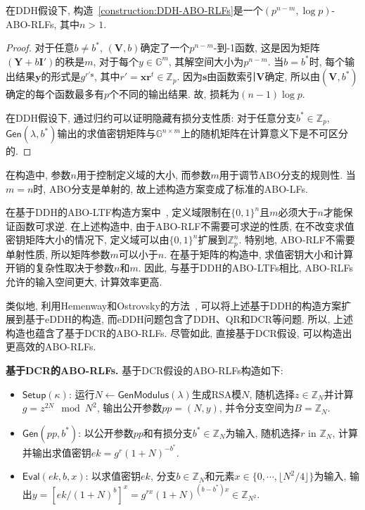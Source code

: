 \begin{lemma}
	在DDH假设下, 构造~\ref{construction:DDH-ABO-RLFs}是一个$(p^{n-m}, \log p)$-ABO-RLFs, 其中$n > 1$.
\end{lemma}
\begin{proof}
对于任意$b \neq b^*$, $(\mathbf{V}, b)$确定了一个$p^{n-m}$-到-1函数, 这是因为矩阵$(\mathbf{Y}+b\mathbf{I}')$的秩是$m$, 对于每个$y \in \mathbb{G}^m$, 其解空间大小为$p^{n-m}$. 
当$b = b^*$时, 每个输出结果$\mathbf{y}$的形式是$g^{r'\mathbf{s}}$, 其中$r' = \mathbf{x} \mathbf{r}^t \in \mathbb{Z}_p$. 因为$\mathbf{s}$由函数索引$\mathbf{V}$确定, 所以由$(\mathbf{V}, b^*)$确定的每个函数最多有$p$个不同的输出结果. 故, 损耗为$(n-1) \log p$.  
	
在DDH假设下, 通过归约可以证明隐藏有损分支性质: 对于任意分支$b^* \in \mathbb{Z}_p$, $\mathsf{Gen}(\lambda, b^*)$输出的求值密钥矩阵与$\mathbb{G}^{n \times m}$上的随机矩阵在计算意义下是不可区分的. 
\end{proof}

\begin{remark}
在构造中, 参数$n$用于控制定义域的大小, 而参数$m$用于调节ABO分支的规则性. 
当$m = n$时, ABO分支是单射的, 故上述构造方案变成了标准的ABO-LFs. 

在基于DDH的ABO-LTF构造方案中~\cite{PW-STOC-2008}, 定义域限制在$\{0,1\}^n$且$m$必须大于$n$才能保证函数可求逆. 在上述构造中, 由于ABO-RLF不需要可求逆的性质, 在不改变求值密钥矩阵大小的情况下, 定义域可以由$\{0,1\}^n$扩展到$\mathbb{Z}_p^n$. 特别地, ABO-RLF不需要单射性质, 所以矩阵参数$m$可以小于$n$. 在基于矩阵的构造中, 求值密钥大小和计算开销的复杂性取决于参数$n$和$m$. 因此, 与基于DDH的ABO-LTFs相比, ABO-RLFs允许的输入空间更大, 计算效率更高.
\end{remark}   

类似地, 利用Hemenway和Ostrovsky的方法~\cite{HO-PKC-2012b}, 可以将上述基于DDH的构造方案扩展到基于eDDH的构造, 而eDDH问题包含了DDH、QR和DCR等问题. 所以, 上述构造也蕴含了基于DCR的ABO-RLFs. 尽管如此, 直接基于DCR假设, 可以构造出更高效的ABO-RLFs.

\medskip\noindent\textbf{基于DCR的ABO-RLFs.} 基于DCR假设的ABO-RLFs构造如下:
\begin{construction}\label{construction:ch5-DCR-ABO-RLFs}  
\begin{itemize} \itemsep 1pt \parskip 0pt \parsep 0pt
	\item $\mathsf{Setup}(\kappa)$: 运行$N \leftarrow \mathsf{GenModulus}(\lambda)$生成RSA模$N$, 
随机选择$z \in \mathbb{Z}_N$并计算$g =z^{2N} \mod N^2$, 输出公开参数$pp = (N, y)$, 并令分支空间为$B = \mathbb{Z}_N$.  
	
	\item $\mathsf{Gen}(pp, b^*)$: 以公开参数$pp$和有损分支$b^* \in \mathbb{Z}_N$为输入, 随机选择$r$ in $\mathbb{Z}_N$, 计算并输出求值密钥$ek=g^r(1+N)^{-b^*}$. 
	
	\item $\mathsf{Eval}(ek, b, x)$: 以求值密钥$ek$, 分支$b \in \mathbb{Z}_N$和元素$x \in \{0, \cdots,\lfloor N^2/4\rfloor\}$为输入, 输出$y = [ek/(1+N)^{b}]^x = g^{rx}(1+N)^{(b-b^*)x} \in \mathbb{Z}_{N^2}$.    
\end{itemize}
\end{construction}

